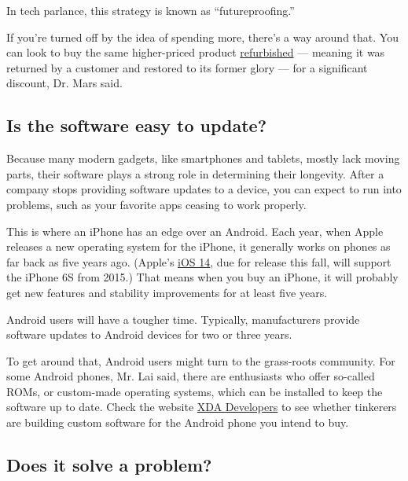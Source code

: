 In tech parlance, this strategy is known as ``futureproofing.''

If you're turned off by the idea of spending more, there's a way around
that. You can look to buy the same higher-priced product
\href{https://www.nytimes3xbfgragh.onion/2016/04/28/technology/personaltech/taking-the-stigma-out-of-buying-usedelectronics.html}{refurbished}
--- meaning it was returned by a customer and restored to its former
glory --- for a significant discount, Dr. Mars said.

\hypertarget{is-the-software-easy-to-update}{%
\subsection{Is the software easy to
update?}\label{is-the-software-easy-to-update}}

Because many modern gadgets, like smartphones and tablets, mostly lack
moving parts, their software plays a strong role in determining their
longevity. After a company stops providing software updates to a device,
you can expect to run into problems, such as your favorite apps ceasing
to work properly.

This is where an iPhone has an edge over an Android. Each year, when
Apple releases a new operating system for the iPhone, it generally works
on phones as far back as five years ago. (Apple's
\href{https://www.apple.com/ios/ios-14-preview/}{iOS 14}, due for
release this fall, will support the iPhone 6S from 2015.) That means
when you buy an iPhone, it will probably get new features and stability
improvements for at least five years.

Android users will have a tougher time. Typically, manufacturers provide
software updates to Android devices for two or three years.

To get around that, Android users might turn to the grass-roots
community. For some Android phones, Mr. Lai said, there are enthusiasts
who offer so-called ROMs, or custom-made operating systems, which can be
installed to keep the software up to date. Check the website
\href{https://www.xda-developers.com/the-most-popular-custom-roms-on-xda/}{XDA
Developers} to see whether tinkerers are building custom software for
the Android phone you intend to buy.

\hypertarget{does-it-solve-a-problem}{%
\subsection{Does it solve a problem?}\label{does-it-solve-a-problem}}

